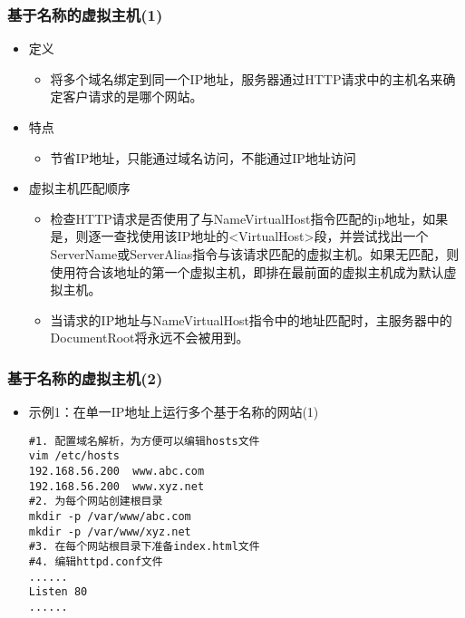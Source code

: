 \documentclass[xcolor=svgnames,presentation]{beamer}
\begin{document}
\begin{frame}
\frametitle{基于名称的虚拟主机(1)}
\label{sec-3-3}
\begin{itemize}

\item 定义
\label{sec-3-3-1}%
\begin{itemize}

\item 将多个域名绑定到同一个IP地址，服务器通过HTTP请求中的主机名来确定客户请求的是哪个网站。
\label{sec-3-3-1-1}%
\end{itemize} %

\item 特点
\label{sec-3-3-2}%
\begin{itemize}

\item 节省IP地址，只能通过域名访问，不能通过IP地址访问
\label{sec-3-3-2-1}%
\end{itemize} %

\item 虚拟主机匹配顺序
\label{sec-3-3-3}%
\begin{itemize}

\item 检查HTTP请求是否使用了与NameVirtualHost指令匹配的ip地址，如果是，则逐一查找使用该IP地址的<VirtualHost>段，并尝试找出一个ServerName或ServerAlias指令与该请求匹配的虚拟主机。如果无匹配，则使用符合该地址的第一个虚拟主机，即排在最前面的虚拟主机成为默认虚拟主机。
\label{sec-3-3-3-1}%

\item 当请求的IP地址与NameVirtualHost指令中的地址匹配时，主服务器中的DocumentRoot将永远不会被用到。
\label{sec-3-3-3-2}%
\end{itemize} %
\end{itemize} %
\end{frame}
\begin{frame}[fragile]
\frametitle{基于名称的虚拟主机(2)}
\label{sec-3-4}
\begin{itemize}

\item 示例1：在单一IP地址上运行多个基于名称的网站(1)\\
\label{sec-3-4-1}%
\begin{verbatim}
#1. 配置域名解析，为方便可以编辑hosts文件
vim /etc/hosts
192.168.56.200  www.abc.com
192.168.56.200  www.xyz.net
#2. 为每个网站创建根目录
mkdir -p /var/www/abc.com
mkdir -p /var/www/xyz.net
#3. 在每个网站根目录下准备index.html文件
#4. 编辑httpd.conf文件
......
Listen 80
......
\end{verbatim}
\end{itemize} %
\end{frame}
\end{document}
